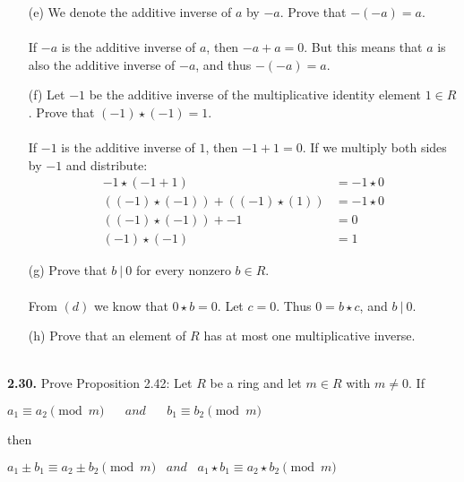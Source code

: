 \documentclass[11pt,fleqn]{article}
\begin{document}
\begin{itemize}
  
\item[(e)] We denote the additive inverse of $a$ by $-a$.  Prove that $-(-a) = a$.\\
  \\
If $-a$ is the additive inverse of $a$, then $-a + a = 0$.  But this means that $a$ is also the additive inverse of $-a$, and thus $-(-a) = a$.
  
\item[(f)] Let $-1$ be the additive inverse of the multiplicative identity element $1 \in R$.  Prove that $(-1) \star (-1) = 1$.\\
  \\
If $-1$ is the additive inverse of $1$, then $-1 + 1 = 0$.  If we multiply both sides by $-1$ and distribute:
\begin{align}
  -1 \star (-1 + 1) &= -1 \star 0\nonumber\\
  ((-1) \star (-1)) + ((-1) \star (1)) &= -1 \star 0\nonumber\\
  ((-1) \star (-1)) + -1 &= 0\nonumber\\
  (-1) \star (-1) &= 1\nonumber
\end{align}
  
\item[(g)] Prove that $b\:|\:0$ for every nonzero $b \in R$.\\
  \\
  From $(d)$ we know that $0 \star b = 0$.  Let $c = 0$.  Thus $0 = b \star c$, and $b\:|\:0$.
  
\item[(h)] Prove that an element of $R$ has at most one multiplicative inverse.\\
  \\
  
\end{itemize}

\begin{flushleft}
\textbf{2.30.} Prove Proposition 2.42: Let $R$ be a ring and let $m \in R$ with $m \neq 0$. If\\
\begin{center}
$a_1 \equiv a_2 \pmod{m} \;\;\; \;\;\; and \;\;\;\;\;\; b_1 \equiv b_2 \pmod{m}$
\end{center}
then\\
\begin{center}
$a_1 \pm b_1 \equiv a_2 \pm b_2 \pmod{m} \;\;\;and\;\;\; a_1 \star b_1 \equiv a_2 \star b_2 \pmod{m}$
\end{center}

\end{flushleft}
\end{document}
